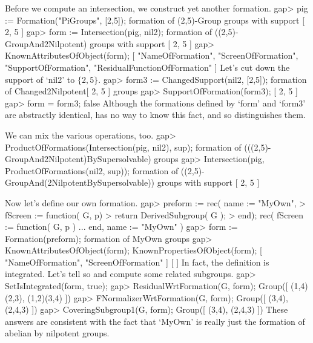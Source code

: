 Before we compute an intersection, we construct yet another formation.
\beginexample
gap> pig := Formation("PiGroups", [2,5]);
formation of (2,5)-Group groups with support [ 2, 5 ]
gap> form := Intersection(pig, nil2);
formation of ((2,5)-GroupAnd2Nilpotent) groups with support [ 2, 5 ]
gap> KnownAttributesOfObject(form);
[ "NameOfFormation", "ScreenOfFormation", "SupportOfFormation", 
  "ResidualFunctionOfFormation" ]
\endexample
 Let's cut down the support of `nil2' to $\{2,5\}$.
\beginexample
gap> form3 := ChangedSupport(nil2, [2,5]);
formation of Changed2Nilpotent[ 2, 5 ] groups 
gap> SupportOfFormation(form3);
[ 2, 5 ]
gap> form = form3;
false
\endexample
Although the formations defined by `form' and `form3' are abstractly
identical, {\GAP} has no way to know this fact, and so distinguishes
them.

We can mix the various operations, too.
\beginexample
gap> ProductOfFormations(Intersection(pig, nil2), sup);
formation of (((2,5)-GroupAnd2Nilpotent)BySupersolvable) groups 
gap> Intersection(pig, ProductOfFormations(nil2, sup));
formation of ((2,5)-GroupAnd(2NilpotentBySupersolvable)) groups with support 
[ 2, 5 ]
\endexample

  Now let's define our own formation.
\beginexample
gap> preform := rec( name := "MyOwn", 
>  fScreen := function( G, p)
>  return DerivedSubgroup( G );
>  end);
rec( fScreen := function( G, p ) ... end, name := "MyOwn" )
gap> form := Formation(preform);
formation of MyOwn groups 
gap> KnownAttributesOfObject(form); KnownPropertiesOfObject(form);
[ "NameOfFormation", "ScreenOfFormation" ]
[  ]
\endexample
In fact, the definition is integrated. Let's tell {\GAP} so and compute
some related subgroups.
\beginexample
gap> SetIsIntegrated(form, true);
gap> ResidualWrtFormation(G, form);
Group([ (1,4)(2,3), (1,2)(3,4) ])
gap> FNormalizerWrtFormation(G, form);
Group([ (3,4), (2,4,3) ])
gap> CoveringSubgroup1(G, form);
Group([ (3,4), (2,4,3) ])
\endexample
These answers are consistent with the fact that `MyOwn' is really just the
formation of abelian by nilpotent groups.
